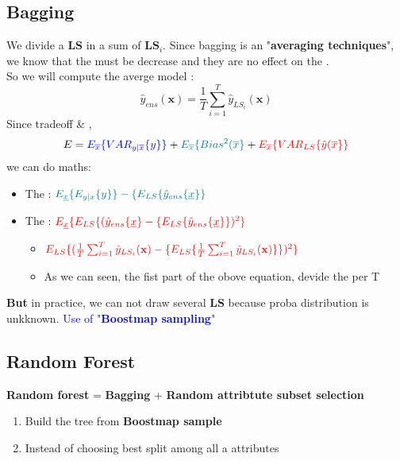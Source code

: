 \subsection{Bagging}
We divide a \textbf{LS} in a sum of $\textbf{LS}_i$. Since bagging is an "\textbf{averaging techniques}", we know that the \variance must be decrease and they are no effect on the \biais.\\
So we will compute the averge model :$$\hat{y}_{ens}(\textbf{x}) = \frac{1}{T}\sum_{i=1}^{T}\hat{y}_{LS_i}(\textbf{x})$$
Since tradeoff \biais \& \variance, 
$$ E = 
 \textcolor{blue}{E_{\overline{x}}\{VAR_{y|\overline{x}}\{y\}\}}
+ \textcolor{teal}{ E_{\overline{x}}\{Bias^2(\overline{x}\}}
+  \textcolor{red}{ E_{\overline{x}}\{VAR_{LS}\{\hat{y}(\overline{x}\}\} }
$$
we can do maths:
\begin{itemize}
    \item The \biais : 
    $ \textcolor{teal}{ E_{\underline{x}}\{E_{y|x}\{y\}\}- \{E_{LS}\{\hat{y}_{ens}\{\underline{x}\}\}} $
    \begin{itemize}
        \item $ \textcolor{teal}{\{E_{y|x}\{y\}\}}$ remains unchanged (Bayes model)
        \item  $ \textcolor{teal}{E_{LS}\{\hat{y}_{ens}\{\underline{x}\}}
        = {E_{LS}\{\frac{1}{T}\sum_{i=1}^{T}\hat{y}_{LS_i}(\textbf{x})\} = {E_{LS}\{\hat{y}_{LS}(\underline{x})\} $, also remains unchanged
    \end{itemize}
    \item The \variance :  $ \textcolor{red}{ E_{\underline{x}}\{E_{LS}\{(\hat{y}_{ens}\{\underline{x}\}- \{E_{LS}\{\hat{y}_{ens}\{\underline{x}\}\})^2\}} $
     \begin{itemize}
        \item $ \textcolor{red}{E_{LS}\{(\frac{1}{T}\sum_{i=1}^{T}\hat{y}_{LS_i}(\textbf{x})- \{E_{LS}\{\frac{1}{T}\sum_{i=1}^{T}\hat{y}_{LS_i}(\textbf{x})\}\})^2\}} $\\
        \item As we can seen, the fist part of the obove equation, devide the \variance per T
    \end{itemize}
    
\end{itemize}
\textbf{But} in practice, we can not draw several \textbf{LS} because proba distribution is unkknown. \textcolor{blue}{Use of "\textbf{Boostmap sampling}"}
\subsection{Random Forest}
\textbf{Random forest} = \textbf{Bagging} + \textbf{Random attribtute subset selection}
\begin{enumerate}
    \item Build the tree from \textbf{Boostmap sample}
    \item Instead of choosing best split among all a attributes
\end{enumerate}
